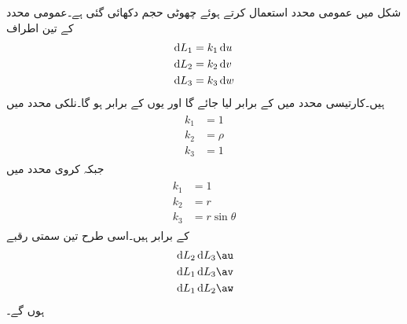 شکل میں عمومی محدد استعمال کرتے ہوئے چھوٹی حجم دکھائی گئی ہے۔عمومی محدد کے تین اطراف
\begin{align*}
\dif L_1 &= k_1 \dif u \\
\dif L_2 &= k_2 \dif v \\
\dif L_3 &= k_3 \dif w 
\end{align*}
ہیں۔کارتیسی محدد میں  کے برابر لیا جائے گا اور یوں  کے برابر ہو گا۔نلکی محدد میں
\begin{gather}
\begin{aligned}\label{مساوات_گاوس_نلکی_اطراف_کے_مستقل}
k_1&=1\\
k_2&=\rho\\
k_3&=1
\end{aligned}
\end{gather}
جبکہ کروی محدد میں
\begin{gather}
\begin{aligned}\label{مساوات_گاوس_کروی_اطراف_کے_مستقل}
k_1&=1\\
k_2&=r\\
k_3&=r \sin \theta
\end{aligned}
\end{gather}
کے برابر ہیں۔اسی طرح تین سمتی رقبے
\begin{align*}
& \dif L_2 \dif L_3 \au\\
&\dif L_1 \dif L_3 \av\\
&\dif L_1 \dif L_2 \aw
\end{align*}
ہوں گے۔

